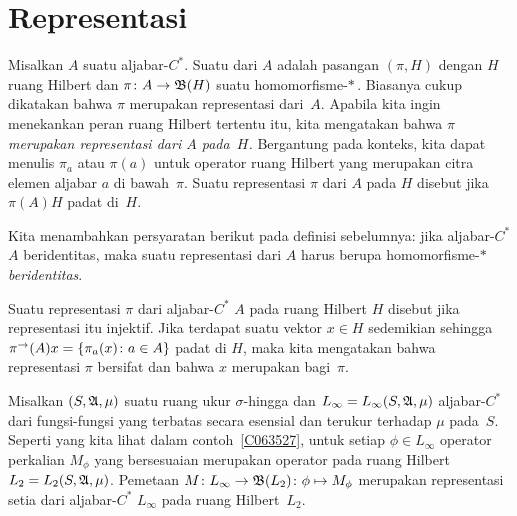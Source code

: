 \section{Representasi}
\begin{defn}\label{0028} Misalkan $A$ suatu aljabar-$C^*$. Suatu
 dari $A$ adalah pasangan $(\pi,H)$ dengan $H$ ruang Hilbert dan $\pi
\colon A \rightarrow \mathfrak{B}(H)$ suatu homomorfisme-$*\,$. Biasanya cukup dikatakan bahwa $\pi$ merupakan
representasi dari~$A$. Apabila kita ingin menekankan peran ruang Hilbert tertentu itu,
kita mengatakan bahwa $\pi$ \emph{merupakan representasi dari $A$ pada~$H$.} Bergantung pada konteks, kita
dapat menulis $\pi_a$ atau $\pi(a)$ untuk operator ruang Hilbert yang merupakan citra
elemen aljabar $a$ di bawah~$\pi$. Suatu representasi $\pi$ dari $A$ pada $H$ disebut
 jika $\pi(A)H$ padat di~$H$.
\end{defn}

\begin{conv} Kita menambahkan persyaratan berikut pada definisi sebelumnya: jika aljabar-$C^*$
$A$ beridentitas, maka suatu representasi dari $A$ harus berupa homomorfisme-$*\,$ \emph{beridentitas}.
\end{conv}

\begin{defn} Suatu representasi $\pi$ dari aljabar-$C^*$ $A$ pada ruang Hilbert $H$ disebut
 jika representasi itu injektif. Jika terdapat suatu vektor $x \in H$ sedemikian sehingga
$\pi^{\rightarrow}(A)x = \{\pi_a(x)\colon a \in A\}$ padat di $H$, maka kita mengatakan bahwa
representasi $\pi$ bersifat
 dan bahwa $x$ merupakan
 bagi~$\pi$.
\end{defn}

\begin{exam}\label{002802} Misalkan $(S, \mathfrak{A}, \mu)$ suatu ruang ukur $\sigma$-hingga dan
$L_\infty = L_\infty(S, \mathfrak{A}, \mu)$ aljabar-$C^*$ dari fungsi-fungsi yang terbatas secara esensial dan
terukur terhadap $\mu$ pada~$S$. Seperti yang kita lihat dalam contoh~\ref{C063527}, untuk setiap $\phi \in
L_\infty$ operator perkalian $M_\phi$ yang bersesuaian merupakan operator pada
ruang Hilbert $L_2 = L_2(S, \mathfrak{A}, \mu)$. Pemetaan $M\colon L_\infty \rightarrow \mathfrak{B}(L_2)\colon \phi \mapsto M_\phi$ merupakan representasi setia dari aljabar-$C^*$
$L_\infty$ pada ruang Hilbert~$L_2$.
\end{exam}

